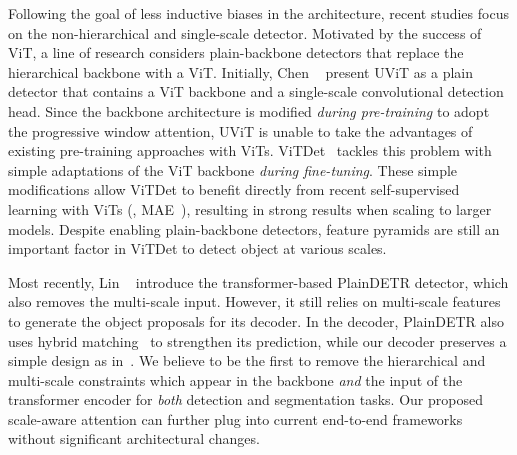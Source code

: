 
 Following the goal of less inductive biases in the architecture, recent studies focus on the non-hierarchical and single-scale detector. Motivated by the success of ViT, a line of research considers plain-backbone detectors that replace the hierarchical backbone with a ViT. Initially, Chen \etal~\cite{chen2022uvit} present UViT as a plain detector that contains a ViT backbone and a single-scale convolutional detection head. Since the backbone architecture is modified \textit{during pre-training} to adopt the progressive window attention, UViT is unable to take the advantages of existing pre-training approaches with ViTs. ViTDet~\cite{li2022vitdet} tackles this problem with simple adaptations of the ViT backbone \textit{during fine-tuning}. These simple modifications allow ViTDet to benefit directly from recent self-supervised learning with ViTs (\ie, MAE~\cite{he2022mae}), resulting in strong results when scaling to larger models. Despite enabling plain-backbone detectors, feature pyramids are still an important factor in ViTDet to detect object at various scales.

Most recently, Lin \etal~\cite{lin2023plaindetr} introduce the transformer-based PlainDETR detector, which also removes the multi-scale input. However, it still relies on multi-scale features to generate the object proposals for its decoder. In the decoder, PlainDETR also uses hybrid matching~\cite{jia2023hybridmatching} to strengthen its prediction, while our decoder preserves a simple design as in~\cite{zhu2021deformable,nguyen2022boxer}. We believe to be the first to remove
the hierarchical and multi-scale constraints which appear in the backbone \textit{and} the input of the transformer encoder for \textit{both} detection and segmentation tasks. Our proposed scale-aware attention can further plug into current end-to-end frameworks without significant architectural changes. %

